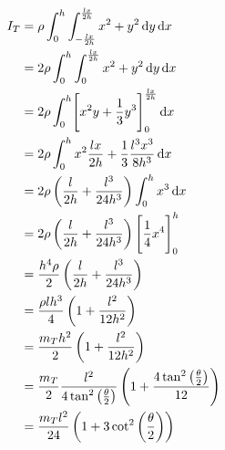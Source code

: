 \begin{equation}
	\label{eq:subtriangle_moment_long}
	\begin{split}
		I_{T} &= \rho \int_0^h\int_{-\frac{lx}{2h}}^{\frac{lx}{2h}}x^2 + y^2 \mathop{}\!\mathrm{d} y\mathop{}\!\mathrm{d} x\\
		&= 2\rho \int_0^h\int_0^{\frac{lx}{2h}} x^2 + y^2 \mathop{}\!\mathrm{d} y\mathop{}\!\mathrm{d} x\\
		&= 2\rho \int_0^h \Biggl[x^2y + \frac{1}{3} y^3\Biggr]_0^{\frac{lx}{2h}} \mathop{}\!\mathrm{d} x\\
		&= 2\rho \int_0^h x^2 \frac{lx}{2h} + \frac{1}{3} \frac{l^3x^3}{8h^3} \mathop{}\!\mathrm{d} x\\
		&= 2\rho \left(\frac{l}{2h} + \frac{l^3}{24h^3}\right) \int_0^h x^3 \mathop{}\!\mathrm{d} x\\
		&= 2\rho \left(\frac{l}{2h} + \frac{l^3}{24h^3}\right)  \Biggl[ \frac{1}{4} x^4\Biggr]_0^h \\
		&= \frac{h^4\rho}{2} \left(\frac{l}{2h} + \frac{l^3}{24h^3}\right) \\
		&= \frac{\rho lh^3}{4} \left(1 + \frac{l^2}{12h^2}\right) \\
		&= \frac{m_T h^2}{2} \left(1 + \frac{l^2}{12h^2}\right) \\
		&= \frac{m_T}{2} \frac{l^2}{4 \tan^2\left(\frac{\theta}{2}\right)}\left(1 + \frac{4 \tan^2\left(\frac{\theta}{2}\right)}{12}\right) \\
		&= \frac{m_Tl^2}{24} \left(1 + 3\cot^2\left(\frac{\theta}{2}\right)\right)
	\end{split}
\end{equation}

\newpage
